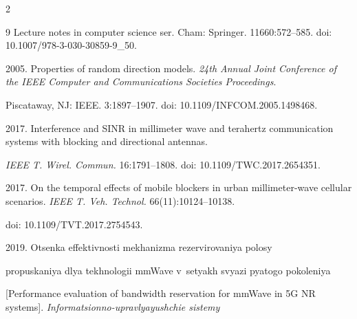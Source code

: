 \begin{multicols}{2}
{{\begin{thebibliography}{9}
Lecture notes in computer science ser. Cham: Springer. 11660:572--585. doi: 10.1007/978-3-030-30859-9\_50.





 2005. Properties of random direction models. \textit{24th Annual Joint Conference of the IEEE Computer and Communications Societies Proceedings}. 

 Piscataway, NJ: IEEE. 3:1897--1907. doi: 10.1109/\linebreak INFCOM.2005.1498468.

 

 





 2017. Interference and SINR in millimeter wave and terahertz communication systems with blocking and directional antennas. 

 \textit{IEEE T. Wirel. Commun.} 16:1791--1808. doi: 10.1109/TWC.2017.2654351.





 2017. On the temporal effects of mobile blockers in urban millimeter-wave cellular scenarios. \textit{IEEE T. Veh. Technol.} 66(11):10124--10138. 

 doi: 10.1109/TVT.2017.2754543.

 



 2019. Otsen\-ka ef\-fek\-tiv\-nosti me\-kha\-niz\-ma re\-zer\-vi\-ro\-va\-niya po\-lo\-sy 

 pro\-pus\-ka\-niya dlya tekh\-no\-lo\-gii mmWave v~se\-tyakh svya\-zi pya\-to\-go po\-ko\-le\-niya 

 [Performance evaluation of bandwidth reservation for mmWave in 5G NR systems]. \textit{Informatsionno-upravlyayushchie sis\-te\-my} 


\end{thebibliography}}}
\end{multicols}
